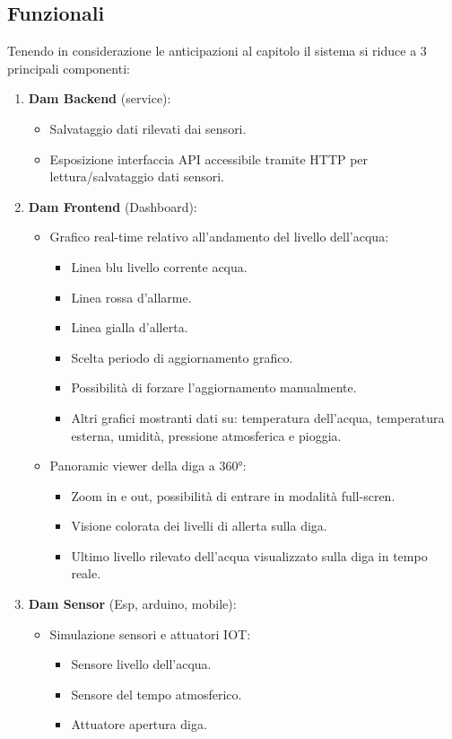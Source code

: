 \documentclass{article}
\begin{document}
\subsection{Funzionali}
Tenendo in considerazione le anticipazioni al capitolo  il sistema si riduce a 3 principali componenti:
\begin{enumerate}
	\item \textbf{Dam Backend} (service):
	\begin{itemize}
		\item Salvataggio dati rilevati dai sensori.
		\item Esposizione interfaccia API accessibile tramite HTTP per lettura/salvataggio dati sensori.
	\end{itemize} 
	\item \textbf{Dam Frontend} (Dashboard):
	\begin{itemize}
		\item Grafico real-time relativo all'andamento del livello dell'acqua:
		\begin{itemize}
			\item Linea blu livello corrente acqua.
			\item Linea rossa d'allarme.
			\item Linea gialla d'allerta.
			\item Scelta periodo di aggiornamento grafico.
			\item Possibilità di forzare l'aggiornamento manualmente.
			\item Altri grafici mostranti dati su: temperatura dell'acqua, temperatura esterna, umidità, pressione atmosferica e pioggia.
		\end{itemize}
		\item Panoramic viewer della diga a 360°:
		\begin{itemize}
			\item Zoom in e out, possibilità di entrare in modalità full-scren.
			\item Visione colorata dei livelli di allerta sulla diga.
			\item Ultimo livello rilevato dell'acqua visualizzato sulla diga in tempo reale.
		\end{itemize}
	\end{itemize}
	\item \textbf{Dam Sensor} (Esp, arduino, mobile):
	\begin{itemize}
		\item Simulazione sensori e attuatori IOT:
		\begin{itemize}
			\item Sensore livello dell'acqua.
			\item Sensore del tempo atmosferico.
			\item Attuatore apertura diga.
		\end{itemize}
	\end{itemize}
\end{enumerate}
\end{document}
